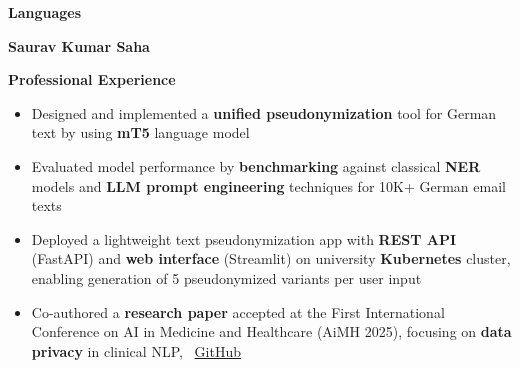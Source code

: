 \documentclass[10pt,a4paper,ragged2e,withhyper]{altacv}
\renewcommand{\cvsectionfont}{\Large\sffamily\bfseries}
\renewcommand{\divider}{\textcolor{PastelRed!50}{\hdashrule{1.015\linewidth}{0.6pt}{0.6ex}}\medskip}
\renewcommand{\cvsection}[2][]{%
  \nointerlineskip\bigskip%
  \ifstrequal{#1}{}{}{\marginpar{\vspace*{\dimexpr1pt-\baselineskip}\raggedright}}%
  {\color{heading}\cvsectionfont{#2}}\\[-1ex]%
  \makebox[0pt][l]{\color{headingrule}\rule{\dimexpr\linewidth+0.25cm}{1pt}}\par\medskip
}
\begin{document}
\begin{paracol}{2}
\vspace{2em}

\cvsection{Languages}

\vspace{1em}

\vspace{1em}



\switchcolumn

\begin{flushleft}
  {\Huge\bfseries\textcolor{PastelRed}{Saurav Kumar Saha}}\\[1pt]
\end{flushleft}
\vspace{1em}


\cvsection{Professional Experience}

\begin{itemize}
\item \justifying Designed and implemented a \textbf{unified pseudonymization} tool for German text by using \textbf{mT5} language model
\item \justifying Evaluated model performance by \textbf{benchmarking} against classical \textbf{NER} models and \textbf{LLM prompt engineering} techniques for 10K+ German email texts
\item \justifying Deployed a lightweight text pseudonymization app with \textbf{REST API} (FastAPI) and \textbf{web interface} (Streamlit) on university \textbf{Kubernetes} cluster, enabling generation of 5 pseudonymized variants per user input
\item \justifying Co-authored a \textbf{research paper} accepted at the First International Conference on AI in Medicine and Healthcare (AiMH 2025), focusing on \textbf{data privacy} in clinical NLP, \faGithub\ \href{https://github.com/calgo-lab/pseugc}{GitHub}
\end{itemize}

\divider


\end{paracol}
\end{document}
